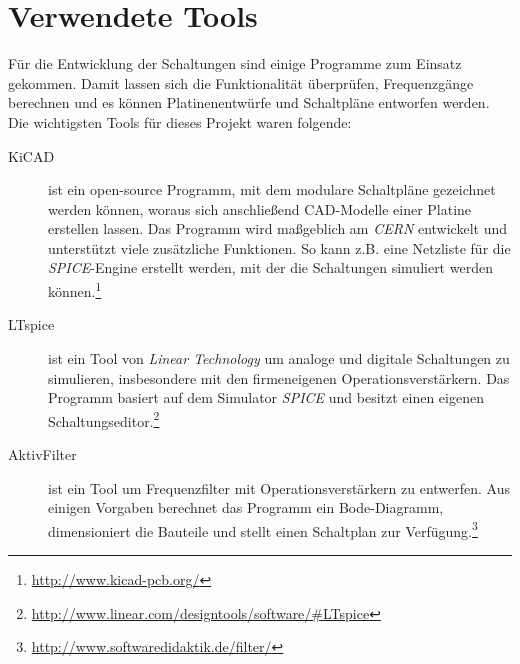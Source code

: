 \section{Verwendete Tools}
Für die Entwicklung der Schaltungen sind einige Programme zum Einsatz gekommen. Damit lassen sich die Funktionalität überprüfen, Frequenzgänge berechnen und es können Platinenentwürfe und Schaltpläne entworfen werden. Die wichtigsten Tools für dieses Projekt waren folgende:
\begin{description}
	\item[KiCAD] ist ein open-source Programm, mit dem modulare Schaltpläne gezeichnet werden können, woraus sich anschließend \ac{CAD}-Modelle einer Platine erstellen lassen. Das Programm wird maßgeblich am \textit{CERN} entwickelt und unterstützt viele zusätzliche Funktionen. So kann z.B. eine Netzliste für die \textit{SPICE}-Engine erstellt werden, mit der die Schaltungen simuliert werden können.\footnote{\url{http://www.kicad-pcb.org/}}
	\item[LTspice] ist ein Tool von \textit{Linear Technology} um analoge und digitale Schaltungen zu simulieren, insbesondere mit den firmeneigenen Operationsverstärkern. Das Programm basiert auf dem Simulator \textit{SPICE} und besitzt einen eigenen Schaltungseditor.\footnote{\url{http://www.linear.com/designtools/software/\#LTspice}}
	\item[AktivFilter] ist ein Tool um Frequenzfilter mit Operationsverstärkern zu entwerfen. Aus einigen Vorgaben berechnet das Programm ein Bode-Diagramm, dimensioniert die Bauteile und stellt einen Schaltplan zur Verfügung.\footnote{\url{http://www.softwaredidaktik.de/filter/}}
\end{description}


